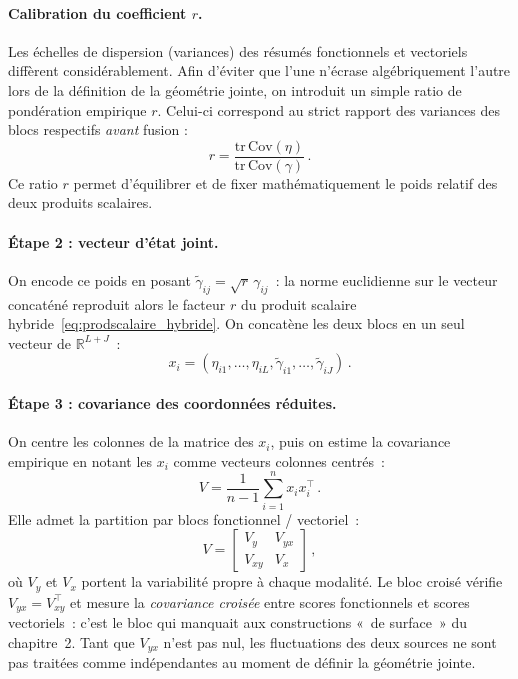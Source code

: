 \documentclass[11pt,a4paper]{article}
\begin{document}
\paragraph{Calibration du coefficient $r$.}
Les échelles de dispersion (variances) des résumés fonctionnels et vectoriels diffèrent considérablement. 
Afin d'éviter que l'une n'écrase algébriquement l'autre lors de la définition de la géométrie jointe, 
on introduit un simple ratio de pondération empirique $r$. Celui-ci correspond au strict rapport des variances 
des blocs respectifs \emph{avant} fusion :
\begin{equation}
  \label{eq:r_trace}
  r = \frac{\mathrm{tr}\,\mathrm{Cov}(\eta)}{\mathrm{tr}\,\mathrm{Cov}(\gamma)}\,.
\end{equation}
Ce ratio $r$ permet d'équilibrer et de fixer mathématiquement le poids relatif des deux produits scalaires.

\paragraph{Étape 2 : vecteur d'état joint.}
On encode ce poids en posant $\tilde{\gamma}_{ij} = \sqrt{r}\,\gamma_{ij}$~: la
norme euclidienne sur le vecteur concaténé reproduit alors le facteur $r$ du
produit scalaire hybride~\eqref{eq:prodscalaire_hybride}. On concatène les
deux blocs en un seul vecteur de $\mathbb{R}^{L+J}$~:
\begin{equation}
  x_i = (\eta_{i1},\ldots,\eta_{iL},\tilde{\gamma}_{i1},\ldots,\tilde{\gamma}_{iJ})\,.
\end{equation}

\paragraph{Étape 3 : covariance des coordonnées réduites.}
On centre les colonnes de la matrice des $x_i$, puis on estime la covariance
empirique en notant les $x_i$ comme vecteurs colonnes centrés~:
\begin{equation}
  V = \frac{1}{n-1}\sum_{i=1}^n x_i x_i^{\top}\,.
\end{equation}
Elle admet la partition par blocs fonctionnel / vectoriel~:
\begin{equation}
  \label{eq:Vblocs}
  V = \begin{bmatrix} V_y & V_{yx} \\ V_{xy} & V_x \end{bmatrix}\,,
\end{equation}
où $V_y$ et $V_x$ portent la variabilité propre à chaque modalité. Le bloc
croisé vérifie $V_{yx} = V_{xy}^{\top}$ et mesure la \emph{covariance croisée}
entre scores fonctionnels et scores vectoriels~: c'est le bloc qui manquait aux
constructions «~de surface~» du chapitre~2. Tant que $V_{yx}$ n'est pas nul, les
fluctuations des deux sources ne sont pas traitées comme indépendantes au moment
de définir la géométrie jointe.
\end{document}
